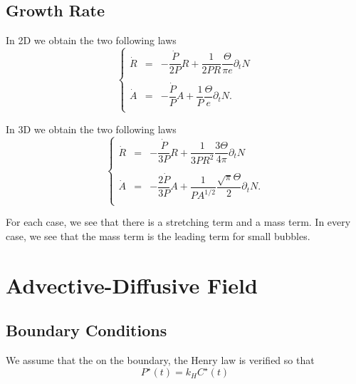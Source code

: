 \documentclass[11pt]{revtex4}
\begin{document}
\subsection{Growth Rate}
In 2D we obtain the two following laws
\begin{equation}
	\label{eq:rate2d}
	\left\lbrace
	\begin{array}{rcl}
	\dot{R} & = & -\dfrac{\dot{P}}{2P} R + \dfrac{1}{2PR} \dfrac{\Theta}{\pi e} \partial_t N\\
	\\
	\dot{A} & = & -\dfrac{\dot{P}}{P} A + \dfrac{1}{P} \dfrac{\Theta}{e} \partial_t N. \\
	\end{array}
	\right.
\end{equation}

In 3D we obtain the two following laws
\begin{equation}
	\label{eq:rate3d}
	\left\lbrace
	\begin{array}{rcl}
	\dot{R} & = & -\dfrac{\dot{P}}{3P} R + \dfrac{1}{3PR^2} \dfrac{3\Theta}{4\pi} \partial_t N\\
	\\
	\dot{A} & = & -\dfrac{2\dot{P}}{3P} A + \dfrac{1}{PA^{1/2}} \dfrac{\sqrt{\pi}\Theta}{2} \partial_t N. \\
	\end{array}
	\right.
\end{equation}

For each case, we see that there is a stretching term and a mass term.
In every case, we see that the mass term is the leading term for small bubbles.

\section{Advective-Diffusive Field}
\subsection{Boundary Conditions}
We assume that the on the boundary, the Henry law is verified so that
\begin{equation}
	P^\star(t) = k_H C^\star(t)
\end{equation}
\end{document}
